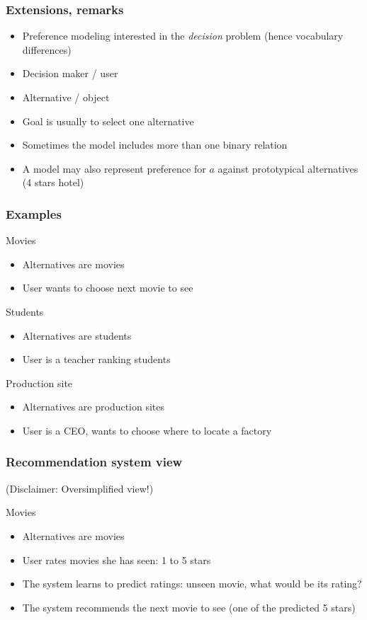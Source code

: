 \documentclass[french,english]{beamer}
\begin{document}
\begin{frame}
	\frametitle{Extensions, remarks}
	\begin{itemize}
		\item Preference modeling interested in the \emph{decision} problem (hence vocabulary differences)
		\item Decision maker / user
		\item Alternative / object
		\item Goal is usually to select one alternative
		\item Sometimes the model includes more than one binary relation
		\item A model may also represent preference for $a$ against prototypical alternatives (4 stars hotel)
	\end{itemize}
\end{frame}

\begin{frame}
	\frametitle{Examples}
	\begin{exampleblock}{Movies}
		\begin{itemize}
			\item Alternatives are movies
			\item User wants to choose next movie to see
		\end{itemize}
	\end{exampleblock}
	\begin{exampleblock}{Students}
		\begin{itemize}
			\item Alternatives are students
			\item User is a teacher ranking students
		\end{itemize}
	\end{exampleblock}
	\begin{exampleblock}{Production site}
		\begin{itemize}
			\item Alternatives are production sites
			\item User is a CEO, wants to choose where to locate a factory
		\end{itemize}
	\end{exampleblock}
\end{frame}

\begin{frame}
	\frametitle{Recommendation system view}
	(Disclaimer: Oversimplified view!)
	\begin{exampleblock}{Movies}
		\begin{itemize}
			\item Alternatives are movies
			\item User rates movies she has seen: 1 to 5 stars
			\item The system learns to predict ratings: unseen movie, what would be its rating?
			\item The system recommends the next movie to see (one of the predicted 5 stars)
		\end{itemize}
	\end{exampleblock}
\end{frame}
\end{document}
